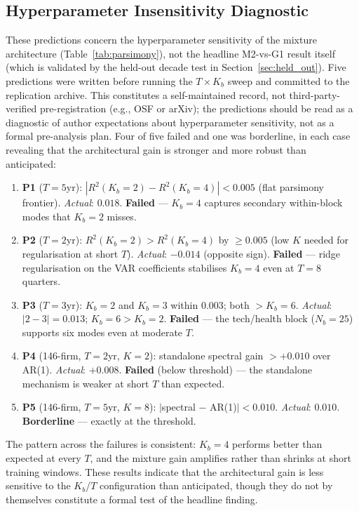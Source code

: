 \documentclass[11pt,a4paper]{article}
\begin{document}
\subsection{Hyperparameter Insensitivity Diagnostic}
\label{sec:prereg}

These predictions concern the hyperparameter sensitivity of the mixture architecture (Table~\ref{tab:parsimony}), not the headline M2-vs-G1 result itself (which is validated by the held-out decade test in Section~\ref{sec:held_out}). Five predictions were written before running the $T \times K_b$ sweep and committed to the replication archive. This constitutes a self-maintained record, not third-party-verified pre-registration (e.g., OSF or arXiv); the predictions should be read as a diagnostic of author expectations about hyperparameter sensitivity, not as a formal pre-analysis plan. Four of five failed and one was borderline, in each case revealing that the architectural gain is stronger and more robust than anticipated:

\begin{enumerate}[nosep]
  \item \textbf{P1} ($T{=}5$yr): $|R^2(K_b{=}2) - R^2(K_b{=}4)| < 0.005$ (flat parsimony frontier). \emph{Actual}: $0.018$. \textbf{Failed} --- $K_b{=}4$ captures secondary within-block modes that $K_b{=}2$ misses.
  \item \textbf{P2} ($T{=}2$yr): $R^2(K_b{=}2) > R^2(K_b{=}4)$ by $\geq 0.005$ (low $K$ needed for regularisation at short $T$). \emph{Actual}: $-0.014$ (opposite sign). \textbf{Failed} --- ridge regularisation on the VAR coefficients stabilises $K_b{=}4$ even at $T{=}8$ quarters.
  \item \textbf{P3} ($T{=}3$yr): $K_b{=}2$ and $K_b{=}3$ within $0.003$; both $> K_b{=}6$. \emph{Actual}: $|2-3| = 0.013$; $K_b{=}6 > K_b{=}2$. \textbf{Failed} --- the tech/health block ($N_b{=}25$) supports six modes even at moderate $T$.
  \item \textbf{P4} (146-firm, $T{=}2$yr, $K{=}2$): standalone spectral gain $> +0.010$ over AR(1). \emph{Actual}: $+0.008$. \textbf{Failed} (below threshold) --- the standalone mechanism is weaker at short $T$ than expected.
  \item \textbf{P5} (146-firm, $T{=}5$yr, $K{=}8$): $|$spectral $-$ AR(1)$| < 0.010$. \emph{Actual}: $0.010$. \textbf{Borderline} --- exactly at the threshold.
\end{enumerate}

The pattern across the failures is consistent: $K_b{=}4$ performs better than expected at every $T$, and the mixture gain amplifies rather than shrinks at short training windows. These results indicate that the architectural gain is less sensitive to the $K_b$/$T$ configuration than anticipated, though they do not by themselves constitute a formal test of the headline finding.
\end{document}
